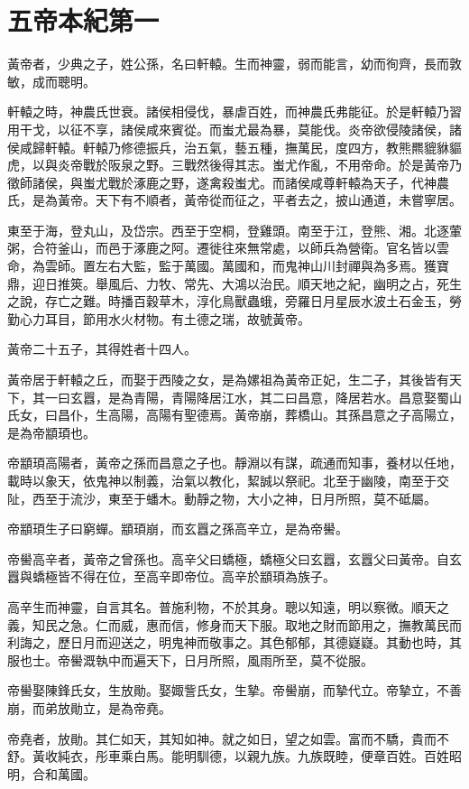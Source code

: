 \chapter{五帝本紀第一}

黃帝者，少典之子，姓公孫，名曰軒轅。生而神靈，弱而能言，幼而徇齊，長而敦敏，成而聰明。

軒轅之時，神農氏世衰。諸侯相侵伐，暴虐百姓，而神農氏弗能征。於是軒轅乃習用干戈，以征不享，諸侯咸來賓從。而蚩尤最為暴，莫能伐。炎帝欲侵陵諸侯，諸侯咸歸軒轅。軒轅乃修德振兵，治五氣，藝五種，撫萬民，度四方，教熊羆貔貅貙虎，以與炎帝戰於阪泉之野。三戰然後得其志。蚩尤作亂，不用帝命。於是黃帝乃徵師諸侯，與蚩尤戰於涿鹿之野，遂禽殺蚩尤。而諸侯咸尊軒轅為天子，代神農氏，是為黃帝。天下有不順者，黃帝從而征之，平者去之，披山通道，未嘗寧居。

東至于海，登丸山，及岱宗。西至于空桐，登雞頭。南至于江，登熊、湘。北逐葷粥，合符釜山，而邑于涿鹿之阿。遷徙往來無常處，以師兵為營衛。官名皆以雲命，為雲師。置左右大監，監于萬國。萬國和，而鬼神山川封禪與為多焉。獲寶鼎，迎日推筴。舉風后、力牧、常先、大鴻以治民。順天地之紀，幽明之占，死生之說，存亡之難。時播百穀草木，淳化鳥獸蟲蛾，旁羅日月星辰水波土石金玉，勞勤心力耳目，節用水火材物。有土德之瑞，故號黃帝。

黃帝二十五子，其得姓者十四人。

黃帝居于軒轅之丘，而娶于西陵之女，是為嫘祖為黃帝正妃，生二子，其後皆有天下，其一曰玄囂，是為青陽，青陽降居江水，其二曰昌意，降居若水。昌意娶蜀山氏女，曰昌仆，生高陽，高陽有聖德焉。黃帝崩，葬橋山。其孫昌意之子高陽立，是為帝顓頊也。

帝顓頊高陽者，黃帝之孫而昌意之子也。靜淵以有謀，疏通而知事，養材以任地，載時以象天，依鬼神以制義，治氣以教化，絜誠以祭祀。北至于幽陵，南至于交阯，西至于流沙，東至于蟠木。動靜之物，大小之神，日月所照，莫不砥屬。

帝顓頊生子曰窮蟬。顓頊崩，而玄囂之孫高辛立，是為帝嚳。

帝嚳高辛者，黃帝之曾孫也。高辛父曰蟜極，蟜極父曰玄囂，玄囂父曰黃帝。自玄囂與蟜極皆不得在位，至高辛即帝位。高辛於顓頊為族子。

高辛生而神靈，自言其名。普施利物，不於其身。聰以知遠，明以察微。順天之義，知民之急。仁而威，惠而信，修身而天下服。取地之財而節用之，撫教萬民而利誨之，歷日月而迎送之，明鬼神而敬事之。其色郁郁，其德嶷嶷。其動也時，其服也士。帝嚳溉執中而遍天下，日月所照，風雨所至，莫不從服。

帝嚳娶陳鋒氏女，生放勛。娶娵訾氏女，生摯。帝嚳崩，而摯代立。帝摯立，不善崩，而弟放勛立，是為帝堯。

帝堯者，放勛。其仁如天，其知如神。就之如日，望之如雲。富而不驕，貴而不舒。黃收純衣，彤車乘白馬。能明馴德，以親九族。九族既睦，便章百姓。百姓昭明，合和萬國。

